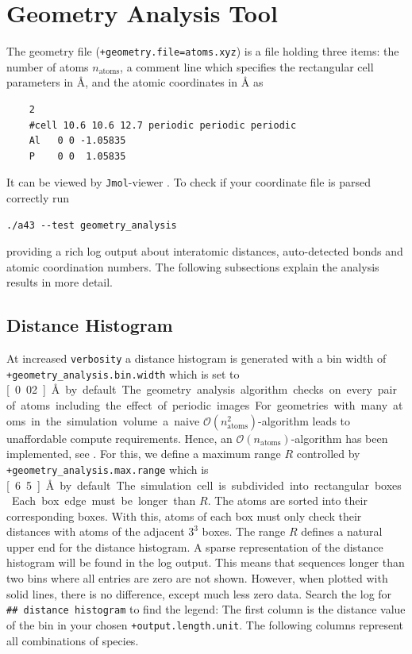 \documentclass[oribibl]{llncs}
\newcommand{\um}[1]{_{\mathrm{#1}}}
\newcommand{\ttt}[1]{\texttt{#1}}
\begin{document}
\section{Geometry Analysis Tool} \label{sec:geometry-analysis}
%
The geometry file (\ttt{+geometry.file=atoms.xyz}) is a file
holding three items:
the number of atoms $n\um{atoms}$, 
a comment line which specifies the rectangular cell parameters in \AA{}, 
and the atomic coordinates in \AA{} as
\begin{verbatim}
    2
    #cell 10.6 10.6 12.7 periodic periodic periodic
    Al   0 0 -1.05835
    P    0 0  1.05835
\end{verbatim}
It can be viewed by \ttt{Jmol}-viewer \cite{jmol-software}.
%
\noindent
To check if your coordinate file is parsed correctly run
\begin{verbatim}
./a43 --test geometry_analysis
\end{verbatim}
providing a rich log output about interatomic distances,
auto-detected bonds and atomic coordination numbers.
The following subsections explain the analysis results in more detail.

\subsection{Distance Histogram} \label{sec:distance-histogram}
%
At increased \ttt{verbosity} a distance histogram is generated with
a bin width of \ttt{+geometry\_analysis.bin.width} which is set to \unit[0.02]{\AA} by default.
The geometry analysis algorithm checks on every pair of atoms
including the effect of periodic images.
For geometries with many atoms in the simulation volume
a naive $\mathcal O(n\um{atoms}^2)$-algorithm 
leads to unaffordable compute requirements.
Hence, an $\mathcal O(n\um{atoms})$-algorithm has been implemented, see \cite{a43theory}.
For this, we define a maximum range $R$ controlled 
by \ttt{+geometry\_analysis.max.range} which is \unit[6.5]{\AA} by default.
The simulation cell is subdivided into rectangular boxes. 
Each box edge must be longer than $R$. 
The atoms are sorted into their corresponding boxes.
With this, atoms of each box must only check their distances 
with atoms of the adjacent $3^3$ boxes.
The range $R$ defines a natural upper end for the distance histogram.
A sparse representation of the distance histogram will be found in the log output.
This means that sequences longer than two bins where all entries are zero are not shown.
However, when plotted with solid lines, there is no difference, except much less zero data.
Search the log for \ttt{\#\# distance histogram} to find the legend:
The first column is the distance value of the bin in your chosen \ttt{+output.length.unit}.
The following columns represent all combinations of species.
\end{document}

